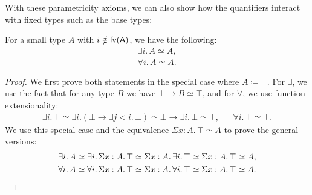 With these parametricity axioms, we can also show how the quantifiers interact with fixed types such as the base types: 
\begin{proposition}
    For a small type \(A\) with \(i\notin\sf{fv}(A)\), we have the following: \begin{align*}
        \exists i.\,A\simeq A, \tag{\(\exists\) parametric over a small fixed type} \\
        \forall i.\,A\simeq A. \tag{\(\forall\) parametric over a small fixed type}
    \end{align*}
\end{proposition}
\begin{proof}
    We first prove both statements in the special case where \(A\coloneqq\top\).
    For \(\exists\), we use the fact that for any type \(B\) we have \(\bot\to B\simeq\top\), and for \(\forall\), we use function extensionality: \begin{align*}
        \exists i.\,\top
        \simeq\exists i.(\bot\to\exists j<i.\,\bot)
        \simeq\bot\to\exists i.\,\bot
        \simeq \top, &&
        \forall i.\,\top\simeq\top.
    \end{align*}
    We use this special case and the equivalence \(\Sigma x:A.\,\top\simeq A\) to prove the general versions: \begin{gather*}
        \exists i.\,A\simeq\exists i.\,\Sigma x:A.\,\top\simeq\Sigma x:A.\,\exists i.\,\top\simeq\Sigma x:A.\,\top\simeq A, \\
        \forall i.\,A\simeq\forall i.\,\Sigma x:A.\,\top\simeq\Sigma x:A.\,\forall i.\,\top\simeq\Sigma x:A.\,\top\simeq A.\qedhere
    \end{gather*}
\end{proof}
% 
    
